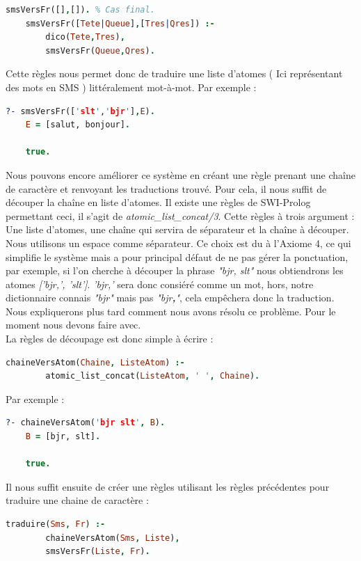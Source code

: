 \documentclass[11pt]{book}
\begin{document}
	\begin{lstlisting}[language=Prolog]
	smsVersFr([],[]). % Cas final.
	smsVersFr([Tete|Queue],[Tres|Qres]) :-
		dico(Tete,Tres),  
		smsVersFr(Queue,Qres).
	\end{lstlisting}
	
	Cette règles nous permet donc de traduire une liste d'atomes ( Ici représentant des mots en SMS ) littéralement mot-à-mot. Par exemple :
	
	\begin{lstlisting}[language=Prolog]
	?- smsVersFr(['slt','bjr'],E). 
	E = [salut, bonjour].
	
	true.
	\end{lstlisting}
	
	Nous pouvons encore améliorer ce système en créant une règle prenant une chaîne de caractère et renvoyant les traductions trouvé. Pour cela, il nous suffit de découper la chaîne en liste d'atomes. Il existe une règles de SWI-Prolog permettant ceci, il s'agit de {\em atomic\_list\_concat/3}. Cette règles à trois argument : Une liste d'atomes, une chaîne qui servira de séparateur et la chaîne à découper. Nous utilisons un espace comme séparateur. Ce choix est du à l'Axiome 4, ce qui simplifie le système mais a pour principal défaut de ne pas gérer la ponctuation, par exemple, si l'on cherche à découper la phrase {\em "bjr, slt"} nous obtiendrons les atomes {\em ['bjr,', 'slt']}. {\em 'bjr,'} sera donc consiéré comme un mot, hors, notre dictionnaire connais {\em "bjr"} mais pas {\em "bjr\textbf{,}"}, cela empêchera donc la traduction. Nous expliquerons plus tard comment nous avons résolu ce problème. Pour le moment nous devons faire avec.\\
	La règles de découpage est donc simple à écrire :
	
	\begin{lstlisting}[language=Prolog]
	chaineVersAtom(Chaine, ListeAtom) :-
		atomic_list_concat(ListeAtom, ' ', Chaine).
	\end{lstlisting}
	
	Par exemple :
	
	\begin{lstlisting}[language=Prolog]
	?- chaineVersAtom('bjr slt', B).
	B = [bjr, slt].
	
	true.
	\end{lstlisting}
	
	Il nous suffit ensuite de créer une règles utilisant les règles précédentes pour traduire une chaine de caractère :
	
	\begin{lstlisting}[language=Prolog]
	traduire(Sms, Fr) :-
		chaineVersAtom(Sms, Liste),
		smsVersFr(Liste, Fr).
	\end{lstlisting}
	
\end{document}
